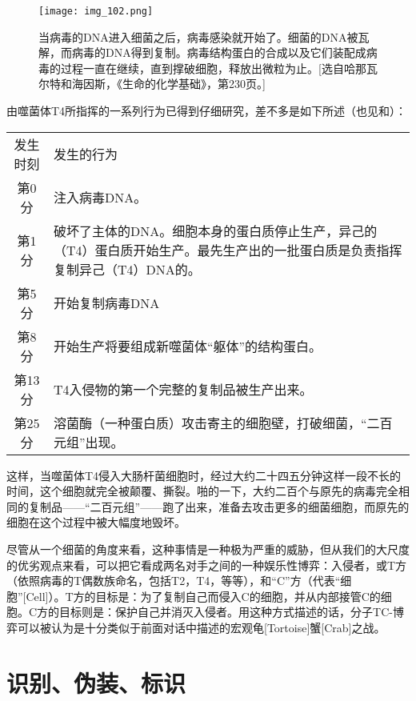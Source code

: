 \begin{figure}
\texttt{[image: img\_102.png]}
\caption[细菌受到病毒的感染。]
  {当病毒的DNA进入细菌之后，病毒感染就开始了。细菌的DNA被瓦解，而病毒的DNA得到复制。病毒结构蛋白的合成以及它们装配成病毒的过程一直在继续，直到撑破细胞，释放出微粒为止。[选自哈那瓦尔特和海因斯，《生命的化学基础》，第230页。]}
\end{figure}

由噬菌体T4所指挥的一系列行为已得到仔细研究，差不多是如下所述（也见和）：

\begin{figure}
\end{figure}

\begin{longtabu}{cX}
发生时刻 & 发生的行为 \\*
第0分 & 注入病毒DNA。 \\
第1分 & 破坏了主体的DNA。细胞本身的蛋白质停止生产，异己的（T4）蛋白质开始生产。最先生产出的一批蛋白质是负责指挥复制异己（T4）DNA的。 \\
第5分 & 开始复制病毒DNA \\
第8分 & 开始生产将要组成新噬菌体“躯体”的结构蛋白。 \\
第13分 & T4入侵物的第一个完整的复制品被生产出来。 \\
第25分 & 溶菌酶（一种蛋白质）攻击寄主的细胞壁，打破细菌，“二百元组”出现。\\
\end{longtabu}

这样，当噬菌体T4侵入大肠杆菌细胞时，经过大约二十四五分钟这样一段不长的时间，这个细胞就完全被颠覆、撕裂。啪的一下，大约二百个与原先的病毒完全相同的复制品——“二百元组”——跑了出来，准备去攻击更多的细菌细胞，而原先的细胞在这个过程中被大幅度地毁坏。

尽管从一个细菌的角度来看，这种事情是一种极为严重的威胁，但从我们的大尺度的优劣观点来看，可以把它看成两名对手之间的一种娱乐性博弈：入侵者，或T方（依照病毒的T偶数族命名，包括T2，T4，等等），和“C”方（代表“细胞”[Cell]）。T方的目标是：为了复制自己而侵入C的细胞，并从内部接管C的细胞。C方的目标则是：保护自己并消灭入侵者。用这种方式描述的话，分子TC-博弈可以被认为是十分类似于前面对话中描述的宏观龟[Tortoise]蟹[Crab]之战。

\section{识别、伪装、标识}

